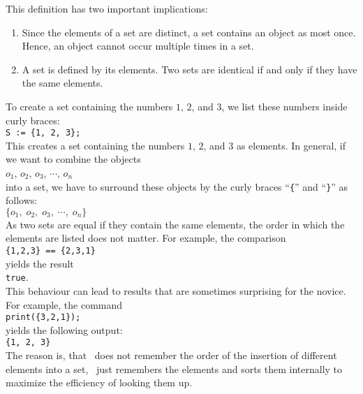 \noindent
This definition has two important implications:
\begin{enumerate}
\item Since the elements of a set are distinct, a set contains an object as most once.
      Hence, an object cannot occur multiple times in  a set.
\item A set is defined by its elements.  Two sets are identical if and only if they have the same elements.
\end{enumerate}
To create a set containing the numbers $1$, $2$, and $3$, we list these numbers inside curly braces:
\\[0.2cm]
\hspace*{1.3cm}
\texttt{S := \{1, 2, 3\};}
\\[0.2cm]
This creates a set containing the numbers $1$, $2$, and $3$ as elements.  In general, if we want to
combine the objects
\\[0.2cm]
\hspace*{1.3cm}
$o_1$, $o_2$, $o_3$, $\cdots$, $o_n$
\\[0.2cm]
into a set, we have to surround these objects by the curly braces ``\texttt{\{}'' and
``\texttt{\}}'' as follows:
\\[0.2cm]
\hspace*{1.3cm}
$\{ o_1,\; o_2,\; o_3,\; \cdots,\; o_n \}$
\\[0.2cm]
As two sets are equal if they contain the same elements, the order in which the elements are listed
does not matter.  For example, the comparison
\\[0.2cm]
\hspace*{1.3cm}
\texttt{\{1,2,3\} == \{2,3,1\}}
\\[0.2cm]
yields the result
\\[0.2cm]
\hspace*{1.3cm}
\texttt{true}.
\\[0.2cm]
This behaviour can lead to results that are sometimes surprising for the novice.  For example, the command
\\[0.2cm]
\hspace*{1.3cm}
\texttt{print(\{3,2,1\});}
\\[0.2cm]
yields the following output:
\\[0.2cm]
\hspace*{1.3cm}
\texttt{\{1, 2, 3\}}
\\[0.2cm]
The reason is, that \setlx\ does not remember the order of the insertion of different elements into
a set, \setlx\ just remembers the elements and sorts them internally to maximize the efficiency of
looking them up.

